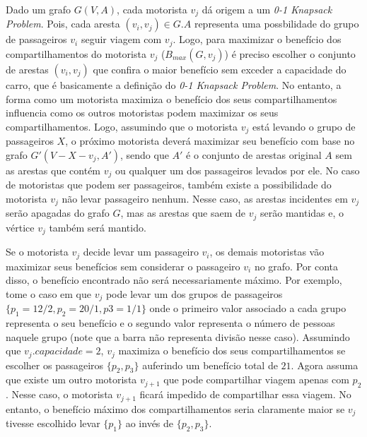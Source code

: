 \documentclass{article}
\begin{document}
Dado um grafo $ G(V,A)$, cada motorista $ v_j $ dá origem a um \textit{0-1 Knapsack Problem}. Pois, cada aresta $ (v_i, v_j) \in G.A $
representa uma possbilidade do grupo de passageiros $ v_i $ seguir viagem com $ v_j $. Logo, para maximizar o benefício dos
compartilhamentos do motorista $ v_j $ ($ B_{max}(G, v_j) $) é preciso escolher o conjunto de arestas $ (v_i, v_j) $ que confira o maior benefício
sem exceder a capacidade do carro, que é basicamente a definição do \textit{0-1 Knapsack Problem}. No entanto, a forma como 
um motorista maximiza o benefício dos seus compartilhamentos influencia como os outros motoristas podem
maximizar os seus compartilhamentos. Logo, assumindo que o motorista $ v_j $ está levando o grupo de passageiros $ X $, o próximo
motorista deverá maximizar seu benefício com base no grafo $ G'(V - X - v_j, A') $, sendo que $ A' $ é o conjunto de arestas original 
$ A $ sem as arestas que contém $ v_j $ ou qualquer um dos passageiros levados por ele. No caso de motoristas que podem ser passageiros,
também existe a possibilidade do motorista $ v_j $ não levar passageiro nenhum. Nesse caso, as arestas incidentes em $ v_j $
serão apagadas do grafo $ G $, mas as arestas que saem de $ v_j $ serão mantidas e, o vértice $ v_j $ também será mantido.

Se o motorista $ v_j $ decide levar um passageiro $ v_i $, os demais motoristas vão maximizar seus benefícios sem considerar o 
passageiro $ v_i $ no grafo. Por conta disso, o benefício encontrado não será necessariamente máximo. Por exemplo, tome o caso em que
$ v_j $ pode levar um dos grupos de passageiros $ \{ p_1 = 12/2, p_2 = 20/1, p3 = 1/1 \} $ onde o primeiro valor associado a cada grupo representa o seu benefício
e o segundo valor representa o número de pessoas naquele grupo (note que a barra não representa divisão nesse caso).
Assumindo que $ v_j.capacidade = 2 $, $ v_j $ maximiza o benefício dos seus compartilhamentos se escolher os passageiros $ \{ p_2, p_3 \} $ auferindo um
benefício total de $ 21 $. Agora assuma que existe um outro motorista $ v_{j+1} $ que pode compartilhar viagem apenas com $ p_2 $. Nesse caso,
o motorista $ v_{j+1} $ ficará impedido de compartilhar essa viagem. No entanto, o benefício máximo dos compartilhamentos seria claramente 
maior se $ v_j $ tivesse escolhido levar $ \{ p_1 \} $ ao invés de $ \{ p_2, p_3 \} $. 
\end{document}
